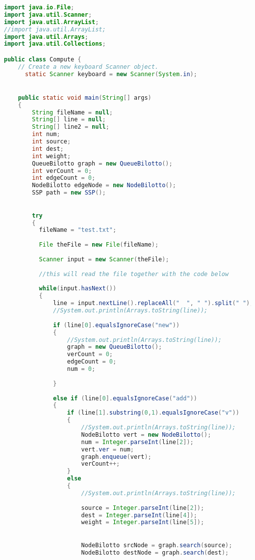 \documentclass[letterpaper, 10pt]{article}
\begin{document}
\begin{lstlisting}[language = java]
import java.io.File;
import java.util.Scanner;
import java.util.ArrayList;
//import java.util.ArrayList;
import java.util.Arrays;
import java.util.Collections;

public class Compute {
	// Create a new keyboard Scanner object.
	  static Scanner keyboard = new Scanner(System.in);


	public static void main(String[] args) 
	{
		String fileName = null;
	    String[] line = null;
	    String[] line2 = null;
	    int num;
	    int source;
	    int dest;
	    int weight;
	    QueueBilotto graph = new QueueBilotto();
	    int verCount = 0;
	    int edgeCount = 0;
	    NodeBilotto edgeNode = new NodeBilotto();
	    SSP path = new SSP();

	   
	    try
	    { 
	      fileName = "test.txt";
	     
	      File theFile = new File(fileName);   
	      
	      Scanner input = new Scanner(theFile);
	      
	      //this will read the file together with the code below         
	      
	      while(input.hasNext())
	      {
	    	  line = input.nextLine().replaceAll("  ", " ").split(" ");
	    	  //System.out.println(Arrays.toString(line));
	    	  
	    	  if (line[0].equalsIgnoreCase("new"))
	    	  {
	    		  //System.out.println(Arrays.toString(line));
	    		  graph = new QueueBilotto();
	    		  verCount = 0;
	    		  edgeCount = 0;
	    		  num = 0;
	    		  
	    	  }
	    	  
	    	  else if (line[0].equalsIgnoreCase("add"))
	    	  {
	    		  if (line[1].substring(0,1).equalsIgnoreCase("v"))
	    		  {
	    			  //System.out.println(Arrays.toString(line));
	    			  NodeBilotto vert = new NodeBilotto();
	    			  num = Integer.parseInt(line[2]);
	    			  vert.ver = num;
	    			  graph.enqueue(vert);
	    			  verCount++;
	    		  }
	    		  else
	    		  {
	    			  //System.out.println(Arrays.toString(line));
	    			  
	    			  source = Integer.parseInt(line[2]);
	    			  dest = Integer.parseInt(line[4]);
	    			  weight = Integer.parseInt(line[5]);
	    			  

	    			  NodeBilotto srcNode = graph.search(source);
	    			  NodeBilotto destNode = graph.search(dest);
	    			  

\end{lstlisting}
\end{document}
